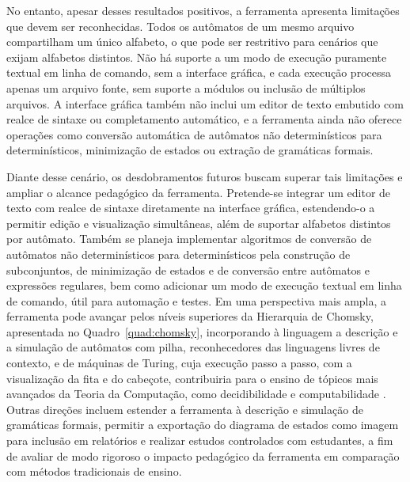 \documentclass[
    12pt
    ,oneside
    ,a4paper
    ,chapter=TITLE
    ,section=TITLE
    ,sumario=abnt-6027-2012]{abntex2}
\begin{document}
No entanto, apesar desses resultados positivos, a ferramenta apresenta limitações
que devem ser reconhecidas. Todos os autômatos de um mesmo arquivo compartilham um
único alfabeto, o que pode ser restritivo para cenários que exijam alfabetos
distintos. Não há suporte a um modo de execução puramente textual em linha de
comando, sem a interface gráfica, e cada execução processa apenas um arquivo fonte,
sem suporte a módulos ou inclusão de múltiplos arquivos. A interface gráfica também
não inclui um editor de texto embutido com realce de sintaxe ou completamento
automático, e a ferramenta ainda não oferece operações como conversão automática de
autômatos não determinísticos para determinísticos, minimização de estados ou
extração de gramáticas formais.

Diante desse cenário, os desdobramentos futuros buscam superar tais limitações e
ampliar o alcance pedagógico da ferramenta. Pretende-se integrar um editor de texto
com realce de sintaxe diretamente na interface gráfica, estendendo-o a permitir
edição e visualização simultâneas, além de suportar alfabetos distintos por
autômato. Também se planeja implementar algoritmos de conversão de autômatos não
determinísticos para determinísticos pela construção de subconjuntos, de minimização
de estados e de conversão entre autômatos e expressões regulares, bem como adicionar
um modo de execução textual em linha de comando, útil para automação e testes.
Em uma perspectiva mais ampla, a ferramenta pode avançar pelos níveis superiores da
Hierarquia de Chomsky, apresentada no Quadro~\ref{quad:chomsky}, incorporando à
linguagem a descrição e a simulação de autômatos com pilha, reconhecedores das
linguagens livres de contexto, e de máquinas de Turing, cuja execução passo a passo,
com a visualização da fita e do cabeçote, contribuiria para o ensino de tópicos mais
avançados da Teoria da Computação, como decidibilidade e computabilidade
\cite{sipser2012,hopcroft2006}.
Outras direções incluem estender a ferramenta à descrição e simulação de gramáticas
formais, permitir a exportação do diagrama de estados como imagem para inclusão em
relatórios e realizar estudos controlados com estudantes, a fim de avaliar de modo
rigoroso o impacto pedagógico da ferramenta em comparação com métodos tradicionais de
ensino.

\end{document}
